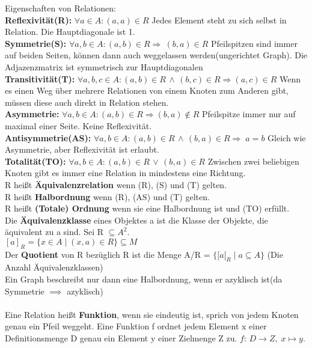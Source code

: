 \documentclass[11pt]{article}
\begin{document}
Eigenschaften von Relationen: \\
{\bfseries Reflexivit{\"a}t(R):} $\forall a \in A\colon (a,a) \in R$ Jedes Element steht zu sich selbst in Relation. Die Hauptdiagonale ist 1. \\
{\bfseries Symmetrie(S):} $\forall a,b \in A\colon (a,b) \in R \Rightarrow\ (b,a) \in R$ Pfeilspitzen sind immer auf beiden Seiten, k{\"o}nnen dann auch weggelassen werden(ungerichtet Graph). Die Adjazenzmatrix ist symmetrisch zur Hauptdiagonalen\\
{\bfseries Transitivit{\"a}t(T):} $\forall a,b,c \in A\colon (a,b) \in R \,\land\, (b,c) \in R \Rightarrow (a,c) \in R$ Wenn es einen Weg {\"u}ber mehrere Relationen von einem Knoten zum Anderen gibt, m{\"u}ssen diese auch direkt in Relation stehen. \\
{\bfseries Asymmetrie:} $\forall a,b \in A\colon (a,b) \in R \Rightarrow (b,a) \notin R$ Pfeilspitze immer nur auf maximal einer Seite. Keine Reflexivit{\"a}t. \\
{\bfseries Antisymmetrie(AS):} $\forall a,b \in A\colon (a,b) \in R \,\land\, (b,a) \in R \Rightarrow\; a = b$ Gleich wie Asymmetrie, aber Reflexivit{\"a}t ist erlaubt. \\
{\bfseries Totalit{\"a}t(TO):} $\forall a,b \in A\colon (a,b) \in R \,\lor\, (b,a) \in R$ Zwischen zwei beliebigen Knoten gibt es immer eine Relation in mindestens eine Richtung.\\
R hei{\ss}t {\bfseries {\"A}quivalenzrelation} wenn (R), (S) und (T) gelten. \\
R hei{\ss}t {\bfseries Halbordnung} wenn (R), (AS) und (T) gelten. \\
R hei{\ss}t {\bfseries (Totale) Ordnung} wenn sie eine Halbordnung ist und (TO) erf{\"u}llt. \\
Die {\bfseries {\"A}quivalenzklasse} eines Objektes a ist die Klasse der Objekte, die {\"a}quivalent zu a sind. Sei R $\subseteq A^2$. \\$[a]_R = \{x\in A\mid (x,a) \in R\} \subseteq M$\\
Der {\bfseries Quotient} von R bez{\"u}glich R ist die Menge A/R = $\{{[}a{[}_R\mid a\subseteq A\}$ (Die Anzahl {\"A}quivalenzklassen)\\
Ein Graph beschreibt nur dann eine Halbordnung, wenn er azyklisch ist(da Symmetrie $\implies$ azyklisch)\\
\\
Eine Relation hei{\ss}t {\bfseries Funktion}, wenn sie eindeutig ist, sprich von jedem Knoten genau ein Pfeil weggeht. Eine Funktion f ordnet jedem Element x einer Definitionsmenge D genau ein Element y einer Zielmenge Z zu. $f\colon\, D\to Z,\; x\mapsto y.$\\
\end{document}

